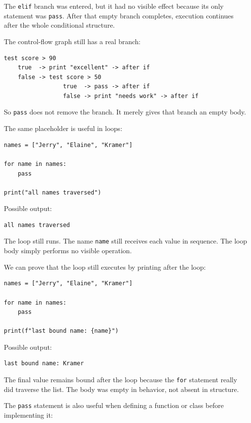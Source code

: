 The \texttt{elif} branch was entered, but it had no visible effect because its only statement was \texttt{pass}. After that empty branch completes, execution continues after the whole conditional structure.

The control-flow graph still has a real branch:

\begin{verbatim}
test score > 90
    true  -> print "excellent" -> after if
    false -> test score > 50
                 true  -> pass -> after if
                 false -> print "needs work" -> after if
\end{verbatim}

So \texttt{pass} does not remove the branch. It merely gives that branch an empty body.

The same placeholder is useful in loops:

\begin{verbatim}
names = ["Jerry", "Elaine", "Kramer"]

for name in names:
    pass

print("all names traversed")
\end{verbatim}

Possible output:

\begin{verbatim}
all names traversed
\end{verbatim}

The loop still runs. The name \texttt{name} still receives each value in sequence. The loop body simply performs no visible operation.

We can prove that the loop still executes by printing after the loop:

\begin{verbatim}
names = ["Jerry", "Elaine", "Kramer"]

for name in names:
    pass

print(f"last bound name: {name}")
\end{verbatim}

Possible output:

\begin{verbatim}
last bound name: Kramer
\end{verbatim}

The final value remains bound after the loop because the \texttt{for} statement really did traverse the list. The body was empty in behavior, not absent in structure.

The \texttt{pass} statement is also useful when defining a function or class before implementing it:

